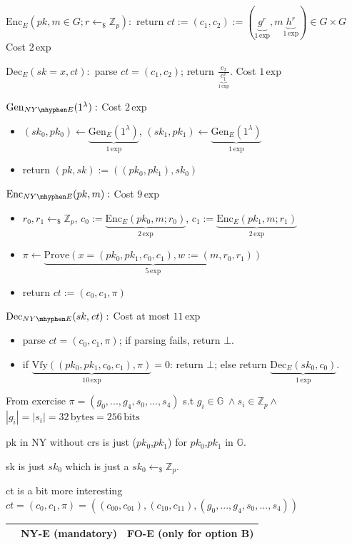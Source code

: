 \documentclass[11pt]{article}
\newcommand{\Gen}{\mathrm{Gen}}
\newcommand{\Enc}{\mathrm{Enc}}
\newcommand{\Dec}{\mathrm{Dec}}
\newcommand{\Prove}{\mathrm{Prove}}
\newcommand{\Vfy}{\mathrm{Vfy}}
\newcommand{\secpar}{\lambda}
\newcommand{\pk}{pk}
\newcommand{\sk}{sk}
\newcommand{\ct}{\mathit{ct}}
\newcommand{\nye}{\ensuremath{NY\mhyphen E}}
\newcommand{\size}[1]{\left|#1\right|}
\newcommand{\sampl}{\gets_\$}
\newcommand{\G}{\mathbb{G}}
\newcommand{\Zp}{\mathbb{Z}_p}
\renewcommand{\exp}[1]{#1\,\mathrm{exp}}
\newcommand{\cost}[2]{\underbrace{#1}_{\exp{#2}}}
\newenvironment{algsteps}
  {\begin{itemize}[label={},leftmargin=1.5em,topsep=3pt,itemsep=4pt,parsep=0pt]}
  {\end{itemize}}
\begin{document}
\begin{enumerate}
$\Enc_E(pk,m \in G; r \sampl \Zp):$ return $ct:=(c_1,c_2) := (\cost{g^r}{1}, m\cost{h^r}{1}) \in G \times G$ \hfill Cost $\exp{2}$

$\Dec_E(sk = x, ct):$ parse $ct = (c_1,c_2)$; return $\frac{c_2}{\cost{c_1^x}{1}}$. \hfill Cost $\exp{1}$

$\Gen_{\nye}(1^\secpar):$ \hfill Cost $\exp{2}$
\begin{algsteps}
  \item $(sk_0,pk_0) \gets \cost{\Gen_E(1^\secpar)}{1}$, $(sk_1,pk_1) \gets \cost{\Gen_E(1^\secpar)}{1}$
  \item return $(pk,sk):=((pk_0,pk_1),sk_0)$
\end{algsteps}

$\Enc_{\nye}(\pk, m):$ \hfill Cost $\exp{9}$
\begin{algsteps}
  \item $r_0,r_1 \sampl \Zp$, $c_0 := \cost{\Enc_E(pk_0,m;r_0)}{2}$, $c_1 := \cost{\Enc_E(pk_1,m;r_1)}{2}$
  \item $\pi \gets \cost{\Prove(x=(pk_0,pk_1,c_0,c_1), w:=(m,r_0,r_1))}{5}$
  \item return $\ct := (c_0,c_1,\pi)$
\end{algsteps}

$\Dec_{\nye}(\sk, \ct):$ \hfill Cost at most $\exp{11}$
\begin{algsteps}
  \item parse $\ct = (c_0,c_1,\pi)$; if parsing fails, return $\bot$.
  \item if $\cost{\Vfy((pk_0,pk_1,c_0,c_1),\pi)}{10}=0$: return $\bot$; else return $\cost{\Dec_E(sk_0,c_0)}{1}$.
\end{algsteps}

From exercise $\pi = (g_0,...,g_4,s_0,...,s_4)$ s.t $g_i \in \G \; \land s_i \in  \Zp \land$ $\size{g_i} = \size{s_i} = 32\,\text{bytes} = 256\,\text{bits}$ 



pk in NY without crs is just ($pk_0$,$pk_1$) for $pk_0$,$pk_1$ in $\G$.

sk is just $sk_0$ which is just a $sk_0 \sampl \Zp$.

ct is a bit more interesting $\ct = (c_0,c_1,\pi)=((c_{00},c_{01}), (c_{10},c_{11}),(g_0,...,g_4,s_0,...,s_4))$

\begin{table}[H]
  \begin{tabular}{l|c|c}
    & NY-E (mandatory) & FO-E (only for option B)\\ \hline
    

\end{tabular}
\end{table}
\end{enumerate}
\end{document}
